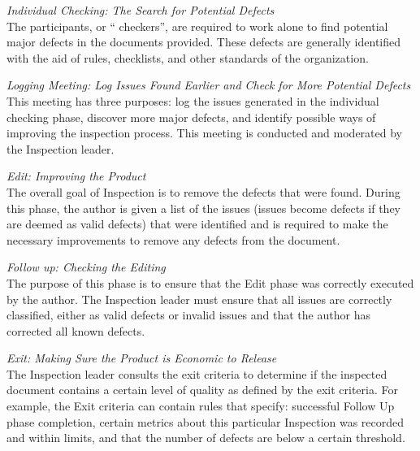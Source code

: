 \begin{flushleft}
  \textit{Individual Checking: The Search for Potential Defects} \\ The
  participants, or `` checkers'', are required to work alone to find
  potential major defects in the documents provided. These defects are
  generally identified with the aid of rules, checklists, and other
  standards of the organization. 
\end{flushleft}

\begin{flushleft}
  \textit{Logging Meeting: Log Issues Found Earlier and Check for More
    Potential Defects} \\ This meeting has three purposes: log the issues
  generated in the individual checking phase, discover more major defects,
  and identify possible ways of improving the inspection process. This
  meeting is conducted and moderated by the Inspection leader. 
\end{flushleft}

\begin{flushleft}
  \textit{Edit: Improving the Product} \\ The overall goal of Inspection
  is to remove the defects that were found. During this phase, the author
  is given a list of the issues (issues become defects if they are deemed
  as valid defects) that were identified and is required to make the
  necessary improvements to remove any defects from the document.
\end{flushleft}

\begin{flushleft}
  \textit{Follow up: Checking the Editing} \\ The purpose of this phase is
  to ensure that the Edit phase was correctly executed by the author. The
  Inspection leader must ensure that all issues are correctly classified,
  either as valid defects or invalid issues and that the author has
  corrected all known defects.
\end{flushleft}

\begin{flushleft}
  \textit{Exit: Making Sure the Product is Economic to Release} \\ The
  Inspection leader consults the exit criteria to determine if the
  inspected document contains a certain level of quality as defined by the
  exit criteria. For example, the Exit criteria can contain rules that
  specify: successful Follow Up phase completion, certain metrics about
  this particular Inspection was recorded and within limits, and that the
  number of defects are below a certain threshold.
\end{flushleft}

